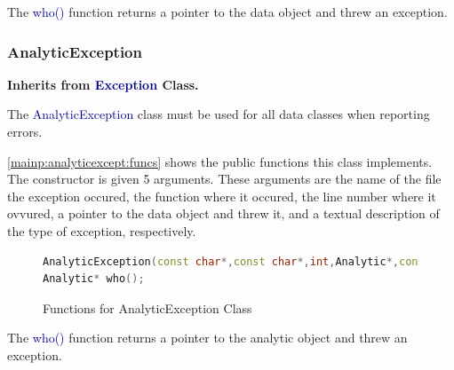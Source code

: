 \documentclass[10pt]{article}
\providecommand{\h}[1]{\textcolor{darkblue}{#1}}
\begin{document}
The \h{who()} function returns a pointer to the data object and threw an 
exception.

\subsubsection{AnalyticException}

\textbf{Inherits from \h{Exception} Class.}

The \h{AnalyticException} class must be used for all data classes when 
reporting errors.

\autoref{mainp:analyticexcept:funcs} shows the public functions this class 
implements. The constructor is given 5 arguments. These arguments are the name 
of the file the exception occured, the function where it occured, the line 
number where it ovvured, a pointer to the data object and threw it, and a 
textual description of the type of exception, respectively.

\begin{figure}[H]
\begin{mdframed}[style=functions]
\begin{lstlisting}[language=C++]
AnalyticException(const char*,const char*,int,Analytic*,const char*);
Analytic* who();
\end{lstlisting}
\end{mdframed}
\caption{Functions for AnalyticException Class}
\label{mainp:analyticexcept:funcs}
\end{figure}

The \h{who()} function returns a pointer to the analytic object and threw an 
exception.
\end{document}

